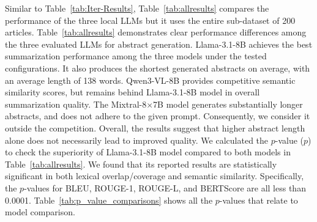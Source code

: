 \documentclass[bdcc,article,submit,pdftex,moreauthors]{Definitions/mdpi}
\newcommand{\commentVP}[1]{\textcolor{orange}{\textbf{VP:} #1}}
\begin{document}



Similar to Table~\ref{tab:Iter-Results}, Table~\ref{tab:allresults} compares the performance of the three local LLMs but it uses the entire sub-dataset of 200 articles.
Table~\ref{tab:allresults} demonstrates clear performance differences among the three evaluated LLMs for abstract generation. 
Llama-3.1-8B achieves the best summarization performance among the three models under the tested configurations.
It also produces the shortest generated abstracts on average, with an average length of 138 words.
Qwen3-VL-8B provides competitive semantic similarity scores, but remains behind Llama-3.1-8B model in overall summarization quality. The Mixtral-8$\times$7B model generates substantially longer abstracts, and does not adhere to the given prompt. 
Consequently, we consider it outside the competition. Overall, the results suggest that higher abstract length alone does not necessarily lead to improved quality.
We calculated the $p$-value ($p$) to check the superiority of Llama-3.1-8B model compared to both models in Table~\ref{tab:allresults}. 
We found that its reported results are statistically significant in both lexical overlap/coverage and semantic similarity.
Specifically, the $p$-values for BLEU, ROUGE-1, ROUGE-L, and BERTScore are all less than 0.0001.
Table~\ref{tab:p_value_comparisons} shows all the $p$-values that relate to model comparison.
\end{document}

